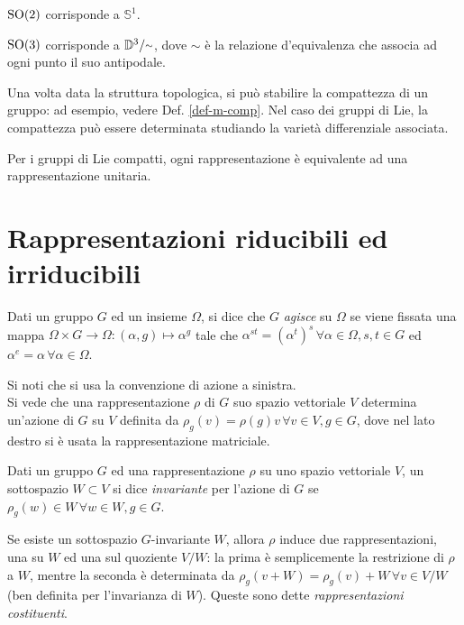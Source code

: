\begin{example}
	$ \mathrm{SO}(2) $ corrisponde a $ \mathbb{S}^1 $.
\end{example}
\begin{example}
	$ \mathrm{SO}(3) $ corrisponde a $ \mathbb{D}^3 / \tildetext $, dove $ \sim $ è la relazione d'equivalenza che associa ad ogni punto il suo antipodale.
\end{example}

Una volta data la struttura topologica, si può stabilire la compattezza di un gruppo: ad esempio, vedere Def. \ref{def-m-comp}. Nel caso dei gruppi di Lie, la compattezza può essere determinata studiando la varietà differenziale associata.

\begin{proposition}
	Per i gruppi di Lie compatti, ogni rappresentazione è equivalente ad una rappresentazione unitaria.
\end{proposition}

\section{Rappresentazioni riducibili ed irriducibili}

\begin{definition}
	Dati un gruppo $ G $ ed un insieme $ \Omega $, si dice che $ G $ \textit{agisce} su $ \Omega $ se viene fissata una mappa $ \Omega \times G \rightarrow \Omega : (\alpha,g) \mapsto \alpha^g $ tale che $ \alpha^{st} = (\alpha^t)^s \,\forall \alpha \in \Omega, s,t \in G $ ed $ \alpha^e = \alpha \,\forall \alpha \in \Omega $.
\end{definition}
Si noti che si usa la convenzione di azione a sinistra.\\
Si vede che una rappresentazione $ \rho $ di $ G $ suo spazio vettoriale $ V $ determina un'azione di $ G $ su $ V $ definita da $ \rho_g(v) = \rho(g) v \,\forall v \in V, g \in G $, dove nel lato destro si è usata la rappresentazione matriciale.

\begin{definition}
	Dati un gruppo $ G $ ed una rappresentazione $ \rho $ su uno spazio vettoriale $ V $, un sottospazio $ W \subset V $ si dice \textit{invariante} per l'azione di $ G $ se $ \rho_g(w) \in W \,\forall w \in W, g \in G $.
\end{definition}

Se esiste un sottospazio $ G $-invariante $ W $, allora $ \rho $ induce due rappresentazioni, una su $ W $ ed una sul quoziente $ V / W $: la prima è semplicemente la restrizione di $ \rho $ a $ W $, mentre la seconda è determinata da $ \rho_g(v + W) = \rho_g(v) + W \,\forall v \in V/W $ (ben definita per l'invarianza di $ W $). Queste sono dette \textit{rappresentazioni costituenti}.


